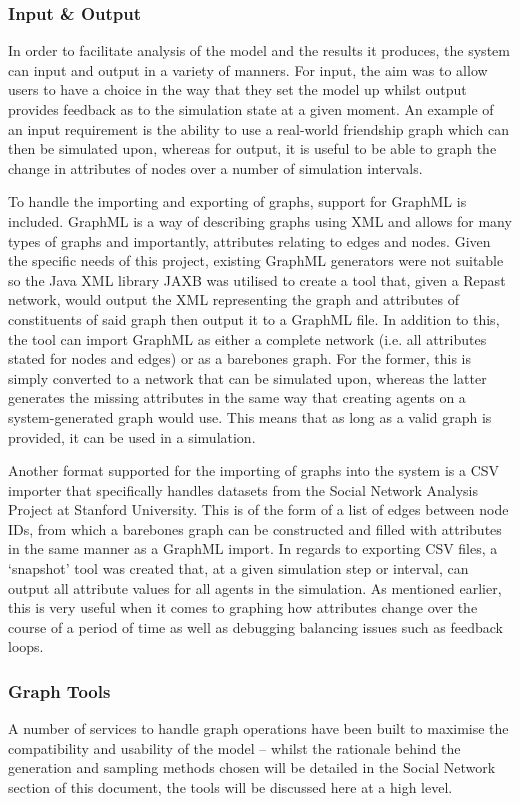 \documentclass[]{report}
\begin{document}
\subsubsection{Input \& Output}
In order to facilitate analysis of the model and the results it produces, the system can input and output in a variety of manners. For input, the aim was to allow users to have a choice in the way that they set the model up whilst output provides feedback as to the simulation state at a given moment. An example of an input requirement is the ability to use a real-world friendship graph which can then be simulated upon, whereas for output, it is useful to be able to graph the change in attributes of nodes over a number of simulation intervals.

To handle the importing and exporting of graphs, support for GraphML is included. GraphML is a way of describing graphs using XML and allows for many types of graphs and importantly, attributes relating to edges and nodes\cite{graphml}. Given the specific needs of this project, existing GraphML generators were not suitable so the Java XML library JAXB was utilised to create a tool that, given a Repast network, would output the XML representing the graph and attributes of constituents of said graph then output it to a GraphML file. In addition to this, the tool can import GraphML as either a complete network (i.e. all attributes stated for nodes and edges) or as a barebones graph. For the former, this is simply converted to a network that can be simulated upon, whereas the latter generates the missing attributes in the same way that creating agents on a system-generated graph would use. This means that as long as a valid graph is provided, it can be used in a simulation.

Another format supported for the importing of graphs into the system is a CSV importer that specifically handles datasets from the Social Network Analysis Project at Stanford University\cite{SNAP}. This is of the form of a list of edges between node IDs, from which a barebones graph can be constructed and filled with attributes in the same manner as a GraphML import. In regards to exporting CSV files, a `snapshot' tool was created that, at a given simulation step or interval, can output all attribute values for all agents in the simulation. As mentioned earlier, this is very useful when it comes to graphing how attributes change over the course of a period of time as well as debugging balancing issues such as feedback loops.

\subsubsection{Graph Tools}
A number of services to handle graph operations have been built to maximise the compatibility and usability of the model – whilst the rationale behind the generation and sampling methods chosen will be detailed in the Social Network section of this document, the tools will be discussed here at a high level.
\end{document}
